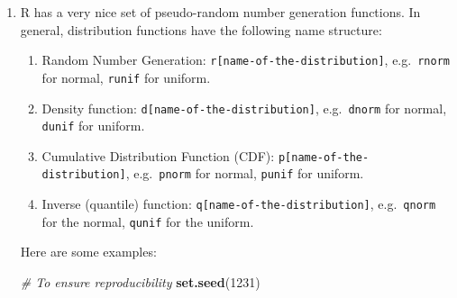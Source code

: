 \documentclass[
]{book}
\newenvironment{Shaded}{\begin{snugshade}}{\end{snugshade}}
\newcommand{\CommentTok}[1]{\textcolor[rgb]{0.56,0.35,0.01}{\textit{#1}}}
\newcommand{\ControlFlowTok}[1]{\textcolor[rgb]{0.13,0.29,0.53}{\textbf{#1}}}
\newcommand{\DecValTok}[1]{\textcolor[rgb]{0.00,0.00,0.81}{#1}}
\newcommand{\FunctionTok}[1]{\textcolor[rgb]{0.13,0.29,0.53}{\textbf{#1}}}
\newcommand{\NormalTok}[1]{#1}
\newcommand{\OtherTok}[1]{\textcolor[rgb]{0.56,0.35,0.01}{#1}}
\newcommand{\SpecialCharTok}[1]{\textcolor[rgb]{0.81,0.36,0.00}{\textbf{#1}}}
\newcommand{\StringTok}[1]{\textcolor[rgb]{0.31,0.60,0.02}{#1}}
\providecommand{\tightlist}{%
  \setlength{\itemsep}{0pt}\setlength{\parskip}{0pt}}
\begin{document}
\begin{enumerate}
\begin{Shaded}
\begin{Highlighting}[]
\CommentTok{\# A while}
\NormalTok{i }\OtherTok{\textless{}{-}} \DecValTok{10}
\ControlFlowTok{while}\NormalTok{ (i }\SpecialCharTok{\textgreater{}} \DecValTok{0}\NormalTok{) \{}
  \FunctionTok{print}\NormalTok{(}\FunctionTok{paste}\NormalTok{(}\StringTok{"I\textquotesingle{}m step"}\NormalTok{, i, }\StringTok{"/"}\NormalTok{, }\DecValTok{10}\NormalTok{))}
\NormalTok{  i }\OtherTok{\textless{}{-}}\NormalTok{ i }\SpecialCharTok{{-}} \DecValTok{1}
\NormalTok{\}}
\end{Highlighting}
\end{Shaded}

\begin{verbatim}
## [1] "I'm step 10 / 10"
## [1] "I'm step 9 / 10"
## [1] "I'm step 8 / 10"
## [1] "I'm step 7 / 10"
## [1] "I'm step 6 / 10"
## [1] "I'm step 5 / 10"
## [1] "I'm step 4 / 10"
## [1] "I'm step 3 / 10"
## [1] "I'm step 2 / 10"
## [1] "I'm step 1 / 10"
\end{verbatim}
\item
  R has a very nice set of pseudo-random number generation functions. In general, distribution functions have the following name structure:

  \begin{enumerate}
  \def\labelenumii{\alph{enumii}.}
  \tightlist
  \item
    Random Number Generation: \texttt{r{[}name-of-the-distribution{]}}, e.g.~\texttt{rnorm} for normal, \texttt{runif} for uniform.
  \item
    Density function: \texttt{d{[}name-of-the-distribution{]}}, e.g.~\texttt{dnorm} for normal, \texttt{dunif} for uniform.
  \item
    Cumulative Distribution Function (CDF): \texttt{p{[}name-of-the-distribution{]}}, e.g.~\texttt{pnorm} for normal, \texttt{punif} for uniform.
  \item
    Inverse (quantile) function: \texttt{q{[}name-of-the-distribution{]}}, e.g.~\texttt{qnorm} for the normal, \texttt{qunif} for the uniform.
  \end{enumerate}

  Here are some examples:

\begin{Shaded}
\begin{Highlighting}[]
\CommentTok{\# To ensure reproducibility}
\FunctionTok{set.seed}\NormalTok{(}\DecValTok{1231}\NormalTok{)}


\end{Highlighting}
\end{Shaded}
\end{enumerate}
\end{document}
